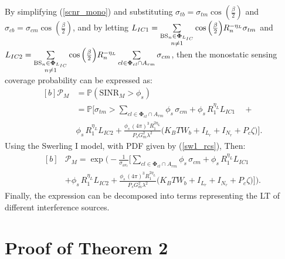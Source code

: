 \documentclass[journal]{IEEEtran}
\begin{document}
By simplifying (\ref{scnr_mono}) and substituting $\sigma_{tb}=\sigma_{tm} \cos{\left(\frac{\beta}{2}\right)}$ and $\sigma_{cb}=\sigma_{cm}\cos{\left(\frac{\beta}{2}\right)}$, and by letting 
$L_{IC1}= \sum\limits_{\substack{\text{BS}_{n }\in \bold\Phi_{L_{IC}}\\ n \neq 1}} \cos{\left(\frac{\beta}{2}\right)} R_n^{-\eta_L} \sigma_{tm}$  and  $L_{IC2}= \sum\limits_{\substack{\text{BS}_{n }\in \bold\Phi_{L_{IC}}\\ n \neq 1}} \cos{\left(\frac{\beta}{2}\right)} R_n^{-\eta_L} \sum\limits_{cl\in\bold\Phi_{cl}\cap A_{rm}} \sigma_{cm}$, then 
the monostatic sensing coverage probability can be expressed as:
\small
\begin{equation}
\begin{aligned}[b]
\mathcal{P}_M &= \mathbb{P} \left( \text{SINR}_M > \phi_s \right) \\
&= \mathbb{P} \bigg[\sigma_{tm} > \sum\limits_{cl \in \boldsymbol{\Phi}_{cl} \cap A_{rm}} \phi_s \, \sigma_{cm} + \phi_s \, R_1^{\eta_L} L_{IC1}\quad + \\
& \phi_s \, R_1^{\eta_L} L_{IC2} 
+ \frac{\phi_s \, (4\pi)^3 R_{1}^{2 \eta_L}}{P_s G_{m}^2 \lambda^2} 
\bigg( K_B T W_b + I_{L_r} + I_{N_r} + P_c \zeta \bigg) \bigg].
\end{aligned}
\end{equation}
\normalsize
 Using the Swerling I model, with PDF given by (\ref{sw1_rcs}), Then:
 \small
\begin{equation}
\begin{aligned}[b]
&\mathcal{P}_M = \exp\bigg( - \frac{1}{\sigma_{\text{av}_t}} \bigg[\sum_{cl \in \boldsymbol{\Phi}_{cl} \cap A_{rm}} \phi_s \, \sigma_{cm} 
+ \phi_s \, R_1^{\eta_L} L_{IC1} \\
& + \phi_s \, R_1^{\eta_L} L_{IC2} 
+ \frac{\phi_s \, (4\pi)^3 R_1^{2 \eta_L}}{P_s G_m^2 \lambda^2} 
\bigg(K_B T W_b + I_{L_r} + I_{N_r} + P_c \zeta \bigg) \bigg] \bigg).
\end{aligned}
\end{equation}
\normalsize
Finally, the expression can be decomposed into terms representing the LT of different interference sources.



\section{Proof of Theorem 2}
\end{document}
